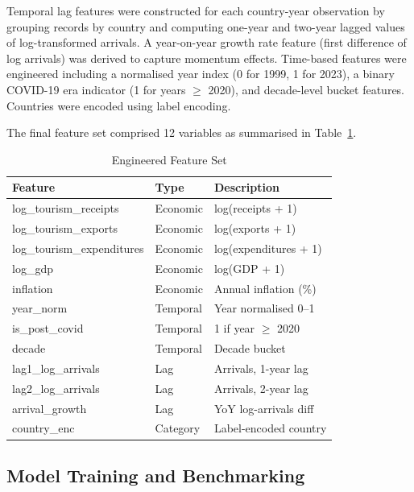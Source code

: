 \documentclass[conference]{IEEEtran}
\begin{document}
Temporal lag features were constructed for each
country-year observation by grouping records by country
and computing one-year and two-year lagged values of
log-transformed arrivals. A year-on-year growth rate
feature (first difference of log arrivals) was derived to
capture momentum effects. Time-based features were
engineered including a normalised year index (0 for 1999,
1 for 2023), a binary COVID-19 era indicator (1 for years
$\geq$ 2020), and decade-level bucket features. Countries
were encoded using label encoding.

The final feature set comprised 12 variables as summarised
in Table~\ref{tab:features}.

\begin{table}[htbp]
  \caption{Engineered Feature Set}
  \label{tab:features}
  \centering
  \begin{tabular}{lll}
    \toprule
    \textbf{Feature} & \textbf{Type} & \textbf{Description} \\
    \midrule
    log\_tourism\_receipts     & Economic & log(receipts + 1) \\
    log\_tourism\_exports      & Economic & log(exports + 1) \\
    log\_tourism\_expenditures & Economic & log(expenditures + 1) \\
    log\_gdp                   & Economic & log(GDP + 1) \\
    inflation                  & Economic & Annual inflation (\%) \\
    year\_norm                 & Temporal & Year normalised 0--1 \\
    is\_post\_covid            & Temporal & 1 if year $\geq$ 2020 \\
    decade                     & Temporal & Decade bucket \\
    lag1\_log\_arrivals        & Lag      & Arrivals, 1-year lag \\
    lag2\_log\_arrivals        & Lag      & Arrivals, 2-year lag \\
    arrival\_growth            & Lag      & YoY log-arrivals diff \\
    country\_enc               & Category & Label-encoded country \\
    \bottomrule
  \end{tabular}
\end{table}

\subsection{Model Training and Benchmarking}
\end{document}
